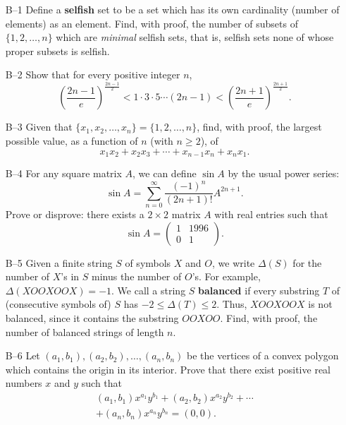 \documentclass[amssymb,twocolumn,pra,10pt,aps]{revtex4-1}
\begin{document}
\begin{itemize}
\item[B--1]
Define a \textbf{selfish} set to be a set which has its own
cardinality (number of elements) as an element. Find, with proof, the
number of subsets of $\{1, 2, \ldots, n\}$ which are \textit{minimal}
selfish sets, that is, selfish sets none of whose proper subsets is selfish.

\item[B--2]
Show that for every positive integer $n$,
\[
\left( \frac{2n-1}{e} \right)^{\frac{2n-1}{2}} < 1 \cdot 3 \cdot 5
\cdots (2n-1) < \left( \frac{2n+1}{e} \right)^{\frac{2n+1}{2}}.
\]

\item[B--3]
Given that $\{x_1, x_2, \ldots, x_n\} = \{1, 2, \ldots, n\}$, find,
with proof, the largest possible value, as a function of $n$ (with $n
\geq 2$), of
\[
x_1x_2 + x_2x_3 + \cdots + x_{n-1}x_n + x_nx_1.
\]

\item[B--4]
For any square matrix $A$, we can define $\sin A$ by the usual power
series:
\[
\sin A = \sum_{n=0}^\infty \frac{(-1)^n}{(2n+1)!} A^{2n+1}.
\]
Prove or disprove: there exists a $2 \times 2$ matrix $A$ with real
entries such that
\[
\sin A = \left( \begin{array}{cc} 1 & 1996 \\ 0 & 1 \end{array} \right).
\]

\item[B--5]
Given a finite string $S$ of symbols $X$ and $O$, we write $\Delta(S)$
for the number of $X$'s in $S$ minus the number of $O$'s. For example,
$\Delta(XOOXOOX) = -1$. We call a string $S$ \textbf{balanced} if every
substring $T$ of (consecutive symbols of) $S$ has $-2 \leq \Delta(T)
\leq 2$. Thus, $XOOXOOX$ is not balanced, since it contains the
substring $OOXOO$. Find, with proof, the number of balanced strings of
length $n$.

\item[B--6]
Let $(a_1, b_1), (a_2, b_2), \ldots, (a_n, b_n)$ be the vertices of a
convex polygon which contains the origin in its interior. Prove that
there exist positive real numbers $x$ and $y$ such that
\begin{gather*}
(a_1, b_1)x^{a_1} y^{b_1} + (a_2, b_2)x^{a_2}y^{b_2} + \cdots \\
+ (a_n, b_n)x^{a_n}y^{b_n} = (0,0).
\end{gather*}
\end{itemize}
\end{document}

